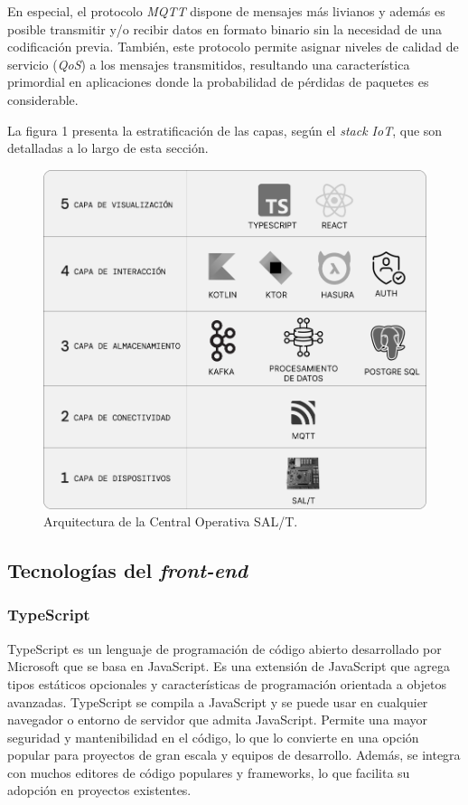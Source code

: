 En especial, el protocolo \textit{MQTT} dispone de mensajes más livianos y además es posible transmitir y/o recibir datos en formato binario sin la necesidad de una codificación previa. También, este protocolo permite asignar niveles de calidad de servicio (\textit{QoS}) a los mensajes transmitidos, resultando una característica primordial en aplicaciones donde la probabilidad de pérdidas de paquetes es considerable.

La figura 1 presenta la estratificación de las capas, según el \textit{stack IoT}, que son detalladas a lo largo de esta sección.

\begin{figure}[htpb]
  \centering 
  \includegraphics[width=.75\textwidth]{Figures/cuadro.jpg}
  \caption{Arquitectura de la Central Operativa SAL/T.}
  \label{fig:diagBloques}
\end{figure}



\subsection{Tecnologías del \textit{front-end}}

\subsubsection{TypeScript}

TypeScript es un lenguaje de programación de código abierto desarrollado por Microsoft que se basa en JavaScript. Es una extensión de JavaScript que agrega tipos estáticos opcionales y características de programación orientada a objetos avanzadas. TypeScript se compila a JavaScript y se puede usar en cualquier navegador o entorno de servidor que admita JavaScript. Permite una mayor seguridad y mantenibilidad en el código, lo que lo convierte en una opción popular para proyectos de gran escala y equipos de desarrollo. Además, se integra con muchos editores de código populares y frameworks, lo que facilita su adopción en proyectos existentes.


